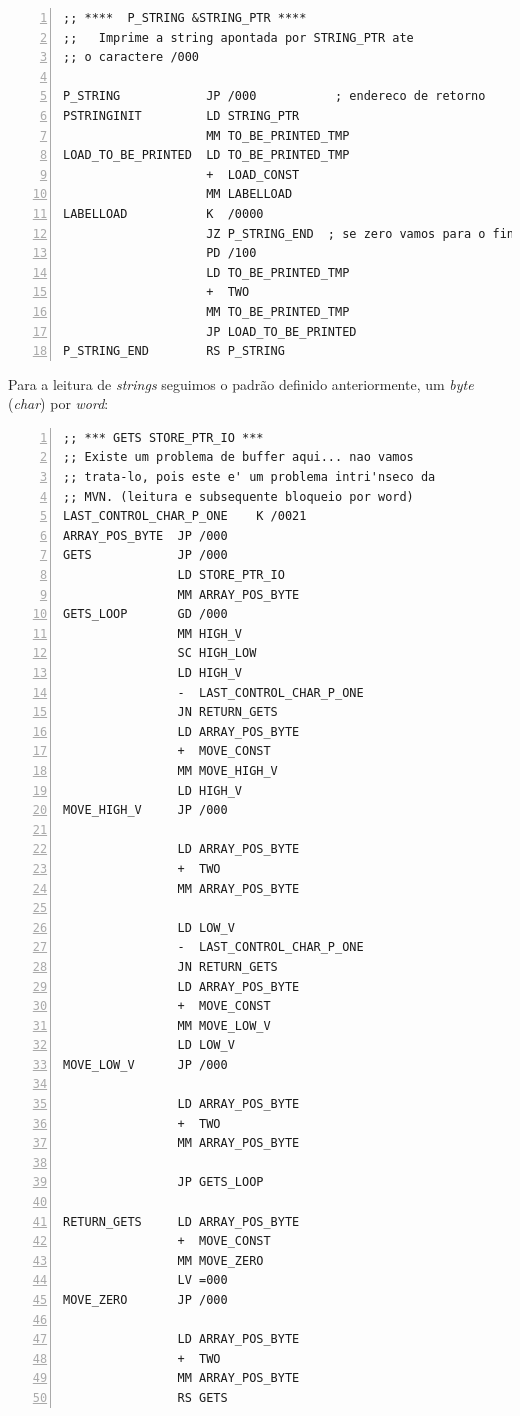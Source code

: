 \begin{lstlisting}[basicstyle=\footnotesize,numbers=left,breaklines=true,morekeywords={}]
;; ****  P_STRING &STRING_PTR ****
;;   Imprime a string apontada por STRING_PTR ate
;; o caractere /000  

P_STRING            JP /000           ; endereco de retorno 
PSTRINGINIT         LD STRING_PTR 
                    MM TO_BE_PRINTED_TMP 
LOAD_TO_BE_PRINTED  LD TO_BE_PRINTED_TMP
                    +  LOAD_CONST    
                    MM LABELLOAD 
LABELLOAD           K  /0000 
                    JZ P_STRING_END  ; se zero vamos para o final!
                    PD /100 
                    LD TO_BE_PRINTED_TMP
                    +  TWO
                    MM TO_BE_PRINTED_TMP
                    JP LOAD_TO_BE_PRINTED
P_STRING_END        RS P_STRING 

 \end{lstlisting}

Para a leitura de \emph{strings} seguimos o padrão definido anteriormente, um
\emph{byte} (\emph{char}) por \emph{word}:

\begin{lstlisting}[basicstyle=\footnotesize,numbers=left,breaklines=true,morekeywords={}]
;; *** GETS STORE_PTR_IO ***
;; Existe um problema de buffer aqui... nao vamos 
;; trata-lo, pois este e' um problema intri'nseco da 
;; MVN. (leitura e subsequente bloqueio por word)
LAST_CONTROL_CHAR_P_ONE    K /0021
ARRAY_POS_BYTE  JP /000
GETS            JP /000
                LD STORE_PTR_IO
                MM ARRAY_POS_BYTE
GETS_LOOP       GD /000
                MM HIGH_V
                SC HIGH_LOW 
                LD HIGH_V 
                -  LAST_CONTROL_CHAR_P_ONE 
                JN RETURN_GETS 
                LD ARRAY_POS_BYTE 
                +  MOVE_CONST 
                MM MOVE_HIGH_V
                LD HIGH_V 
MOVE_HIGH_V     JP /000 

                LD ARRAY_POS_BYTE
                +  TWO 
                MM ARRAY_POS_BYTE 

                LD LOW_V 
                -  LAST_CONTROL_CHAR_P_ONE 
                JN RETURN_GETS 
                LD ARRAY_POS_BYTE 
                +  MOVE_CONST 
                MM MOVE_LOW_V
                LD LOW_V 
MOVE_LOW_V      JP /000 

                LD ARRAY_POS_BYTE
                +  TWO 
                MM ARRAY_POS_BYTE 

                JP GETS_LOOP 

RETURN_GETS     LD ARRAY_POS_BYTE 
                +  MOVE_CONST 
                MM MOVE_ZERO
                LV =000  
MOVE_ZERO       JP /000 

                LD ARRAY_POS_BYTE
                +  TWO 
                MM ARRAY_POS_BYTE 
                RS GETS

\end{lstlisting}

